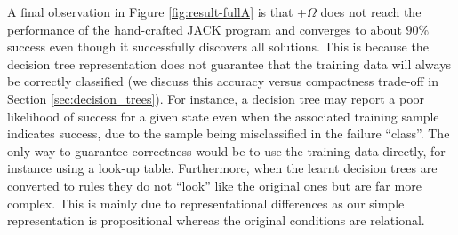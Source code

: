 A final observation in Figure \ref{fig:result-fullA} is that \CL+$\Omega$ does not reach the performance of the hand-crafted JACK program and converges to about $90\%$ success even though it successfully discovers all solutions.
This is because the decision tree representation does not guarantee that the training data will always be correctly classified (we discuss this accuracy versus compactness trade-off in Section \ref{sec:decision_trees}). For instance, a decision tree may report a poor likelihood of success for a given state even when the associated training sample indicates success, due to the sample being misclassified in the failure ``class''. The only way to guarantee correctness would be to use the training data directly, for instance using a look-up table. Furthermore, when the learnt decision trees are converted to rules they do not ``look'' like the original ones but are far more complex. This is mainly due to representational differences as our simple representation is propositional whereas the original conditions are relational.
